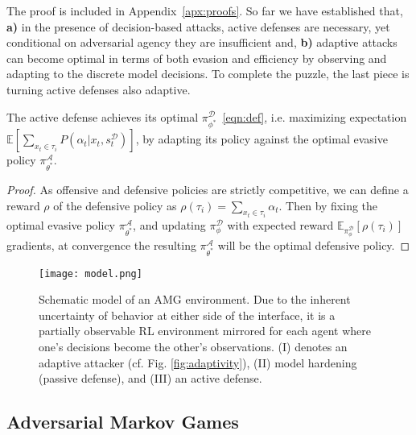 

The proof is included in Appendix~\ref{apx:proofs}.
So far we have established that, \textbf{a)} in the presence of decision-based attacks, active defenses are necessary, yet conditional on adversarial agency they are insufficient and, \textbf{b)} adaptive attacks can become optimal in terms of both evasion and efficiency by observing and adapting to the discrete model decisions.
To complete the puzzle, the last piece is turning active defenses also adaptive.

\begin{corollary}
The active defense achieves its optimal $\pi_{\phi^*}^{\mathcal{D}}$~\eqref{eqn:def}, i.e. maximizing expectation $\mathbb{E}[\sum_{x_t \in \tau_i}P(\alpha_t|x_t,s^{\mathcal{D}}_t)]$, by adapting its policy against the optimal evasive policy ${\pi^\mathcal{A}_{\theta^*}}$.
\label{prop:3}
\end{corollary}

\begin{proof}
  As offensive and defensive policies are strictly competitive, we can define a reward $\rho$ of the defensive policy as $\rho(\tau_i) = \sum_{x_t \in \tau_i} \alpha_t$.
  Then by fixing the optimal evasive policy $\pi_{\theta^*}^\mathcal{A}$, and updating $\pi_\phi^{\mathcal{D}}$ with expected reward $\mathbb{E}_{\pi^\mathcal{D}_\phi}[\rho(\tau_i)]$ gradients, at convergence the resulting ${\pi^\mathcal{A}_{\theta^*}}$ will be the optimal defensive policy.
  \end{proof}

\begin{figure}
    \centering
    \texttt{[image: model.png]}
    \caption[Schematic model of an AMG environment.]{Schematic model of an AMG environment. Due to the inherent uncertainty of behavior at either side of the interface, it is a partially observable RL environment mirrored for each agent where one's decisions become the other's observations. (I) denotes an adaptive attacker (cf. Fig. \ref{fig:adaptivity}), (II) model hardening (passive defense), and (III) an active defense.}
    \label{fig:model}
\end{figure}

\subsection{Adversarial Markov Games}
\label{sec:AMG}

